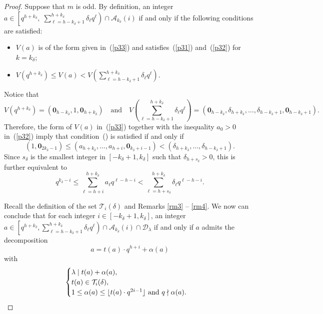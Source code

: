 \documentclass[journal,onecolumn]{IEEEtran}
\begin{document}
\begin{proof} 
Suppose that $m$ is odd. By definition, an integer
$
a \in \left[q^{h+k_{\delta}}, \; \sum_{\ell=h-k_{\delta}+1}^{h+k_{\delta}} \delta_{\ell} q^{\ell}\right) \cap \mathcal{A}_{k_{\delta}}(i)
$
if and only if the following conditions are satisfied:
\begin{itemize}
    \item[(\expandafter{\romannumeral1})] $V(a)$ is of the form given in~(\ref{p33}) and satisfies~(\ref{p31}) and~(\ref{p32}) for $k = k_{\delta}$;
    \item[(\expandafter{\romannumeral2})] $V(q^{h+k_{\delta}}) \leq V(a) < V\left(\sum_{\ell=h-k_{\delta}+1}^{h+k_{\delta}} \delta_{\ell} q^{\ell}\right)$.
\end{itemize}
Notice  that
\begin{equation*}
V(q^{h+k_{\delta}}) = (\mathbf{0}_{h-k_{\delta}}, 1, \mathbf{0}_{h+k_{\delta}})
\quad \text{and} \quad
V\left(\sum_{\ell=h-k_{\delta}+1}^{h+k_{\delta}} \delta_{\ell} q^{\ell}\right) = (\mathbf{0}_{h-k_{\delta}}, \delta_{h+k_{\delta}}, \ldots, \delta_{h-k_{\delta}+1}, \mathbf{0}_{h-k_{\delta}+1}).
\end{equation*}
Therefore, the form of $V(a)$ in~(\ref{p33}) together with the inequality $a_0 > 0$ in~(\ref{p32}) imply that condition~(\expandafter{}) is satisfied if and only if
\begin{equation*}
(1, \mathbf{0}_{2k_{\delta}-1}) \leq (a_{h+k_{\delta}}, \ldots, a_{h+i}, \mathbf{0}_{k_{\delta}+i-1}) < (\delta_{h+k_{\delta}}, \ldots, \delta_{h-k_{\delta}+1}).
\end{equation*}
Since $s_{\delta}$ is the smallest integer in $[-k_{\delta}+1, k_{\delta}]$ such that $\delta_{h+s_{\delta}} > 0$, this is further equivalent to
\begin{equation*}
q^{k_{\delta}-i} \leq \sum_{\ell=h+i}^{h+k_{\delta}} a_{\ell} q^{\ell-h-i} < \sum_{\ell=h+s_{\delta}}^{h+k_{\delta}} \delta_{\ell} q^{\ell-h-i}.
\end{equation*}

Recall the definition of the set $\mathcal{T}_i(\delta)$ and Remarks \ref{rm3} --  \ref{rm4}. We now  
 can  conclude that for each integer $i\in \left[-k_{\delta}+1, k_{\delta}\right]$, 
 an integer $a\in \left[q^{h+k_{\delta}},  \sum\limits_{\ell=h-k_{\delta}+1}^{h+k_{\delta}}\delta_{\ell}q^{\ell}\right)\cap \mathcal{A}_{k_{\delta}}(i)\cap \mathcal{D}_{\lambda}$ 
if and only if  $a$ admits the  decomposition 
\begin{equation*}a=t(a)\cdot q^{h+i}+\alpha(a)\end{equation*}
 with 
 \begin{equation}\notag
\begin{cases}
 \lambda \mid t(a)+\alpha(a),\\
t(a)\in \mathcal{T}_i(\delta),\\
1\leq \alpha(a)\leq \lfloor t(a)\cdot q^{2i-1}\rfloor \hbox{ and } q\nmid \alpha(a).
\end{cases}
\end{equation}



\end{proof}
\end{document}
